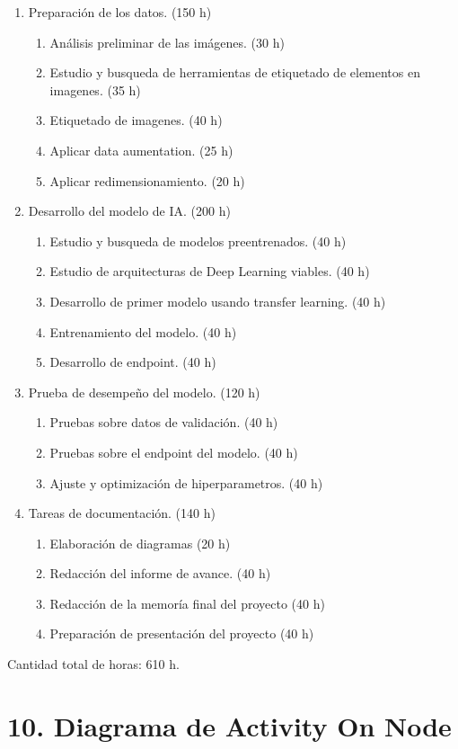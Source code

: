 \documentclass[
11pt, %
]{charter}
\begin{document}
\begin{enumerate}
\item Preparación de los datos. (150 h)
	\begin{enumerate}
	\item Análisis preliminar de las imágenes. (30 h)
	\item Estudio y busqueda de herramientas de etiquetado de elementos en imagenes. (35 h)
	\item Etiquetado de imagenes. (40 h)
	\item Aplicar data aumentation. (25 h)
	\item Aplicar redimensionamiento. (20 h) 
	\end{enumerate}
\item Desarrollo del modelo de IA. (200 h)
	\begin{enumerate}
	\item Estudio y busqueda de modelos preentrenados. (40 h)
	\item Estudio de arquitecturas de Deep Learning viables. (40 h)
	\item Desarrollo de primer modelo usando transfer learning. (40 h)
	\item Entrenamiento del modelo. (40 h)
	\item Desarrollo de endpoint. (40 h)
	\end{enumerate}
\item Prueba de desempeño del modelo. (120 h)
	\begin{enumerate}
	\item Pruebas sobre datos de validación.  (40 h)
	\item Pruebas sobre el endpoint del modelo. (40 h)
	\item Ajuste y optimización de hiperparametros. (40 h)
	\end{enumerate}
\item Tareas de documentación. (140 h)
	\begin{enumerate}
	\item Elaboración de diagramas (20 h)
	\item Redacción del informe de avance. (40 h)
	\item Redacción de la memoría final del proyecto (40 h)
	\item Preparación de presentación del proyecto (40 h)
	\end{enumerate}
\end{enumerate}

Cantidad total de horas: 610 h.

\section{10. Diagrama de Activity On Node}
\label{sec:AoN}
\end{document}
